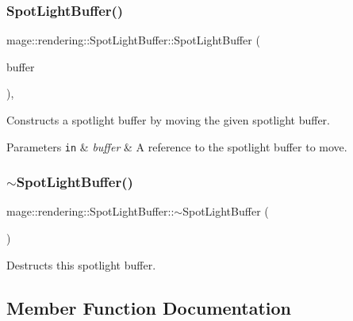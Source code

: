 \subsubsection{\texorpdfstring{Spot\+Light\+Buffer()}{SpotLightBuffer()}\hspace{0.1cm}{\footnotesize\ttfamily [3/3]}}
{\footnotesize\ttfamily mage\+::rendering\+::\+Spot\+Light\+Buffer\+::\+Spot\+Light\+Buffer (\begin{DoxyParamCaption}\item[{\hyperlink{structmage_1_1rendering_1_1_spot_light_buffer}{Spot\+Light\+Buffer} \&\&}]{buffer }\end{DoxyParamCaption})\hspace{0.3cm}{\ttfamily [default]}, {\ttfamily [noexcept]}}

Constructs a spotlight buffer by moving the given spotlight buffer.


\begin{DoxyParams}[1]{Parameters}
\mbox{\tt in}  & {\em buffer} & A reference to the spotlight buffer to move. \\
\hline
\end{DoxyParams}
\hypertarget{structmage_1_1rendering_1_1_spot_light_buffer_ab1fecb64be60d395b0bc5d3e6cc4072a}{}\label{structmage_1_1rendering_1_1_spot_light_buffer_ab1fecb64be60d395b0bc5d3e6cc4072a} 
\subsubsection{\texorpdfstring{$\sim$\+Spot\+Light\+Buffer()}{~SpotLightBuffer()}}
{\footnotesize\ttfamily mage\+::rendering\+::\+Spot\+Light\+Buffer\+::$\sim$\+Spot\+Light\+Buffer (\begin{DoxyParamCaption}{ }\end{DoxyParamCaption})\hspace{0.3cm}{\ttfamily [default]}}

Destructs this spotlight buffer. 

\subsection{Member Function Documentation}
\hypertarget{structmage_1_1rendering_1_1_spot_light_buffer_a6bfd4e7dc9b8a7d3cd5206c9becb91cf}{}\label{structmage_1_1rendering_1_1_spot_light_buffer_a6bfd4e7dc9b8a7d3cd5206c9becb91cf} 
